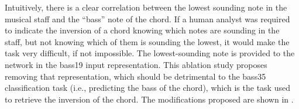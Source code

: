 
Intuitively, there is a clear correlation between the lowest
sounding note in the musical staff and the ``bass'' note of
the chord. If a human analyst was required to indicate the
inversion of a chord knowing which notes are sounding in the
staff, but not knowing which of them is sounding the lowest,
it would make the task very difficult, if not impossible.
The lowest-sounding note is provided to the network in the
\gls{bass19} input representation. This ablation study
proposes removing that representation, which should be
detrimental to the \gls{bass35} classification task (i.e.,
predicting the bass of the chord), which is the task used to
retrieve the inversion of the chord. The modifications
proposed are shown in .


